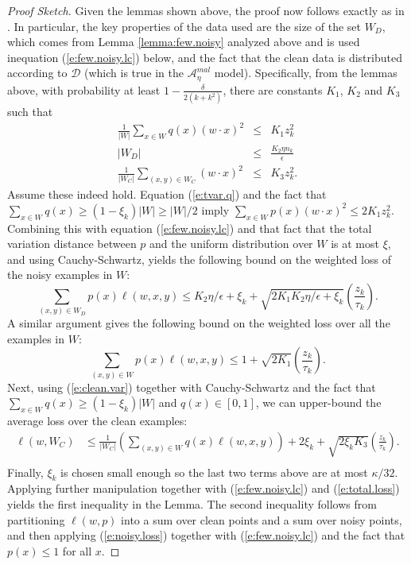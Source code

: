 \documentclass[11pt]{article}
\newcommand{\0}{\mathbf{0}}
\newcommand{\1}{\mathbf{1}}
\newcommand{\cA}{\mathcal{A}}
\newcommand{\cD}{\mathcal{D}}
\begin{document}
\begin{proof}[Proof Sketch]
Given the lemmas shown above, the proof now follows exactly as in \cite{awasthi2017power}.  In particular, the key properties of the data used are the size of the set $W_D$, which comes from Lemma \ref{lemma:few.noisy} analyzed above and is used inequation (\ref{e:few.noisy.lc}) below, and the fact that the clean data is distributed according to $\cD$ (which is true in the $\cA^{mal}_\eta$ model).  Specifically,
from the lemmas above, with probability at least {
$1 - \frac{\delta}{2(k+k^2)}$, there are constants
$K_1$, $K_2$ and $K_3$ such that  
\begin{eqnarray}
\label{e:tvar.q}
\frac{1}{|W|}
  \sum_{x \in W} q(x) (w \cdot x)^2 & \leq & K_1 z^2_k \\
\label{e:few.noisy.lc}
|W_D| & \leq & \frac{K_2 \eta n_k}{\epsilon} \\
\label{e:clean.var}
\frac{1}{|W_C|} \sum_{(x,y) \in W_C} (w \cdot x)^2
     & \leq & K_3 z_k^2.
\end{eqnarray}
}
Assume these indeed hold. Equation (\ref{e:tvar.q}) and the fact that
{$\sum_{x \in W} q(x) \geq (1 - \xi_k) |W| \geq |W|/2$ imply
$
\sum_{x \in W} p(x) (w \cdot x)^2 \leq {2 K_1}z^2_k.
$
}
Combining this with equation (\ref{e:few.noisy.lc}) and that fact that the total variation distance between $p$ and the uniform distribution over $W$ is at most $\xi$, and using Cauchy-Schwartz, yields the following bound on the weighted loss of the noisy examples in $W$:
{
\begin{equation}
 \label{e:noisy.loss}
  \sum_{(x,y) \in W_D} p(x) \ell(w,x,y) \le
    K_2 \eta/\epsilon  + \xi_k
      + \sqrt{2 K_1 K_2 \eta/\epsilon + \xi_k} \left(\frac{z_k}{\tau_k}\right).
 \end{equation}
}
A similar argument gives the following bound on the weighted loss over all the examples in $W$:
{
\begin{equation}
\label{e:total.loss}
\sum_{(x,y) \in W} p(x) \ell(w,x,y) \le 1
   + \sqrt{2 K_1} \left( \frac{ z_k}{\tau_k} \right).
\end{equation}
}
Next, using (\ref{e:clean.var}) together with Cauchy-Schwartz and the fact that $\sum_{x \in W} q(x) \geq (1 - \xi_k) |W|$ and $q(x)\in [0,1]$, we can upper-bound the average loss over the clean examples:
{
\begin{align*}
\ell(w,W_C)
 & \leq \frac{1}{|W_C|} \left( \sum_{(x,y) \in W} q(x) \ell(w,x,y) \right)
  + 2 \xi_k + \sqrt{ 2 \xi_k K_3 } \left( \frac{z_k}{\tau_k} \right). \\
\end{align*}
}
Finally, $\xi_k$ is chosen small enough so the last two terms above are at most $\kappa/32$.  Applying further manipulation together with (\ref{e:few.noisy.lc}) and (\ref{e:total.loss}) yields the first inequality in the Lemma.  The second inequality follows from partitioning $\ell(w,p)$ into a sum over clean points and a sum over noisy points, and then applying (\ref{e:noisy.loss}) together with (\ref{e:few.noisy.lc}) and the fact that $p(x)\leq 1$ for all $x$.
\end{proof}
\end{document}
